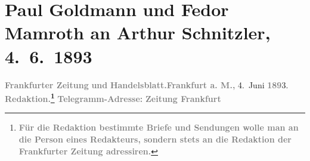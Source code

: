 

         
         \renewcommand{\erwaehntePersonen}{Personen: Samuel Fischer, Carl Freund, Wilhelm Friedrich, Max Jeckel, Edgar Pierson, Salo Schottlaender}
         \renewcommand{\erwaehnteInstitutionen}{Institutionen: E. Pierson’s Verlag, Frankfurter Zeitung, Freund {\kaufmannsund} Jeckel, S. Fischer Verlag, S. Schottländer, Verlag Wilhelm Friedrich}
         \renewcommand{\erwaehnteOrte}{Orte: Altonaer Straße, Berlin, Breslau, Dresden, Frankfurt am Main, Köthenerstraße, Leipzig, Wien}
         \renewcommand{\erwaehnteWerke}{Werke: Frankfurter Zeitung}
               \section[Paul Goldmann und Fedor Mamroth an Arthur Schnitzler, 4. 6. 1893]{ Paul Goldmann und Fedor Mamroth an Arthur Schnitzler,
               4. 6. 1893}\nopagebreak{}\rehead{ }\begin{ledgroupsized}[t]{13cm}\normalsize\beginnumbering \toendnotes[C]{\smallbreak\pagebreak[2]} 
\toendnotes[C]{\smallbreak}\pstart
           \noindent{}{\pb}\textcolor{gray}{\textbf{\textbf{Frankfurter Zeitung}}}\pend
           \pstart
           \textcolor{gray}{\textbf{und}}\pend
           \pstart
           \textcolor{gray}{\textbf{\textbf{Handelsblatt}.}}\hfill \textcolor{gray}{\textbf{Frankfurt a. M.,}}{ }4. Juni \textcolor{gray}{\textbf{189}}3.\pend
           \pstart
           \textcolor{gray}{\textbf{\textbf{Redaktion.}\footnote{\noindent{}\textcolor{gray}{\textbf{Für die Redaktion bestimmte Briefe und Sendungen wolle
                              man  an die Person eines Redakteurs,
                              sondern stets \textbf{an die Redaktion der Frankfurter Zeitung} adressiren.}}}}}\pend
           \pstart
           \textcolor{gray}{\textbf{\textbf{Telegramm-Adresse:}}}\pend
           \pstart
           \textcolor{gray}{\textbf{\textbf{Zeitung Frankfurt
}}}
\end{ledgroupsized}
